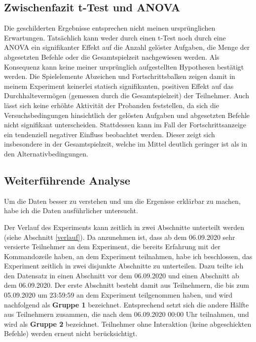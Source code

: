 \subsection{Zwischenfazit t-Test und ANOVA}
Die geschilderten Ergebnisse entsprechen nicht meinen ursprünglichen Erwartungen. Tatsächlich kann weder durch einen t-Test noch durch eine ANOVA ein signifikanter Effekt auf die Anzahl gelöster Aufgaben, die Menge der abgesetzten Befehle oder die Gesamtspielzeit nachgewiesen werden. Als Konsequenz kann keine meiner ursprünglich aufgestellten Hypothesen bestätigt werden. Die Spielelemente Abzeichen und Fortschrittsbalken zeigen damit in meinem Experiment keinerlei statisch signifikanten, positiven Effekt auf das Durchhaltevermögen (gemessen durch die Gesamtspielzeit) der Teilnehmer. Auch lässt sich keine erhöhte Aktivität der Probanden feststellen, da sich die Versuchsbedingungen hinsichtlich der gelösten Aufgaben und abgesetzten Befehle nicht signifikant unterscheiden. Stattdessen kann im Fall der Fortschrittsanzeige ein tendenziell negativer Einfluss beobachtet werden. Dieser zeigt sich insbesondere in der Gesamtspielzeit, welche im Mittel deutlich geringer ist als in den Alternativbedingungen. 

\subsection{Weiterführende Analyse}
Um die Daten besser zu verstehen und um die Ergenisse erklärbar zu machen, habe ich die Daten ausführlicher untersucht.

Der Verlauf des Experiments kann zeitlich in zwei Abschnitte unterteilt werden (siehe Abschnitt \ref{verlauf}). Da anzunehmen ist, dass ab dem 06.09.2020 sehr versierte Teilnehmer an dem Experiment, die bereits Erfahrung mit der Kommandozeile haben, an dem Experiment teilnahmen, habe ich beschlossen, das Experiment zeitlich in zwei disjunkte Abschnitte zu unterteilen. Dazu teilte ich den Datensatz in einen Abschnitt vor dem 06.09.2020 und einen Abschnitt ab dem 06.09.2020. Der erste Abschnitt besteht damit aus Teilnehmern, die bis zum 05.09.2020 um 23:59:59 an dem Experiment teilgenommen haben, und wird nachfolgend als \textbf{Gruppe 1} bezeichnet. Entsprechend setzt sich die andere Hälfte aus Teilnehmern zusammen, die nach dem 06.09.2020 00:00 Uhr teilnahmen, und wird als \textbf{Gruppe 2} bezeichnet. Teilnehmer ohne Interaktion (keine abgeschickten Befehle) werden erneut nicht berücksichtigt.


